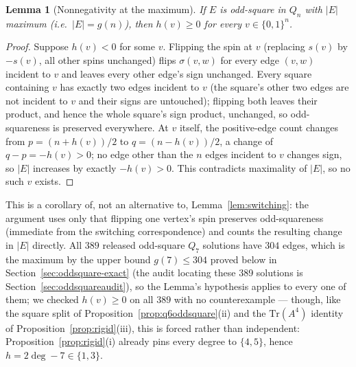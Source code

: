 \documentclass[12pt,a4paper]{article}
\newtheorem{lemma}[theorem]{Lemma}
\theoremstyle{definition}
\begin{document}
\begin{lemma}[Nonnegativity at the maximum]\label{lem:nonneg}
If $E$ is odd-square in $Q_n$ with $|E|$ maximum (i.e.\ $|E|=g(n)$), then
$h(v)\ge0$ for every $v\in\{0,1\}^n$.
\end{lemma}
\begin{proof}
Suppose $h(v)<0$ for some $v$. Flipping the spin at $v$ (replacing
$s(v)$ by $-s(v)$, all other spins unchanged) flips $\sigma(v,w)$ for
every edge $(v,w)$ incident to $v$ and leaves every other edge's sign
unchanged. Every square containing $v$ has exactly two edges incident
to $v$ (the square's other two edges are not incident to $v$ and their
signs are untouched); flipping both leaves their product, and hence the whole
square's sign product, unchanged, so odd-squareness is preserved
everywhere. At $v$ itself, the positive-edge count changes from
$p=(n+h(v))/2$ to $q=(n-h(v))/2$, a change of $q-p=-h(v)>0$; no edge
other than the $n$ edges incident to $v$ changes sign, so $|E|$
increases by exactly $-h(v)>0$. This contradicts maximality of $|E|$, so no such $v$ exists.
\end{proof}
This is a corollary of, not an alternative to, Lemma~\ref{lem:switching}:
the argument uses only that flipping one vertex's spin preserves
odd-squareness (immediate from the switching correspondence) and counts
the resulting change in $|E|$ directly. All $389$ released
odd-square $Q_7$ solutions have $304$ edges, which is the maximum by the
upper bound $g(7)\le304$ proved below in Section~\ref{sec:oddsquare-exact}
(the audit locating these 389 solutions is Section~\ref{sec:oddsquareaudit}), so
the Lemma's hypothesis applies to every one of them; we checked $h(v)\ge0$ on all $389$ with no counterexample --- though, like
the square split of Proposition~\ref{prop:q6oddsquare}(ii) and the
$\mathrm{Tr}(A^4)$ identity of Proposition~\ref{prop:rigid}(iii), this is
forced rather than independent: Proposition~\ref{prop:rigid}(i) already pins
every degree to $\{4,5\}$, hence $h=2\deg-7\in\{1,3\}$.
\end{document}
